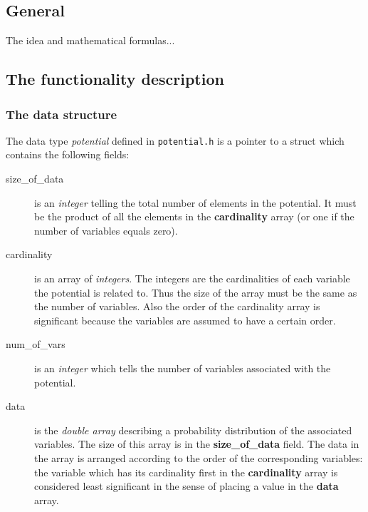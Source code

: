 \documentclass[12pt,a4paper]{report}
\begin{document}
\subsection{General}

The idea and mathematical formulas...


\subsection{The functionality description}
\subsubsection{The data structure}
The data type {\it potential} defined in \verb+potential.h+ is a
pointer to a struct which contains the following fields:
\begin{description}
\item[size\_of\_data] is an {\it integer} telling the total number of 
elements in the potential. It must be the product of all the elements 
in the \textbf{cardinality} array (or one if the number of variables 
equals zero).
\item[cardinality] is an array of {\it integers}. The integers are the
cardinalities of each variable the potential is related to. Thus the
size of the array must be the same as the number of variables. Also
the order of the cardinality array is significant because the
variables are assumed to have a certain order.
\item[num\_of\_vars] is an {\it integer} which tells the number of variables
associated with the potential.
\item[data] is the {\it double array} describing a probability
distribution of the associated variables. The size of this array is in
the \textbf{size\_of\_data} field. The data in the array is arranged
according to the order of the corresponding variables: the variable
which has its cardinality first in the \textbf{cardinality} array is
considered least significant in the sense of placing a value in the
\textbf{data} array. 

\end{description}
\end{document}

